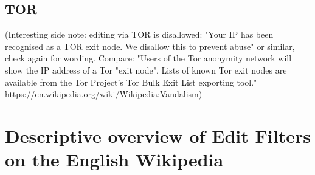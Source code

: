 \documentclass{sigchi}
\begin{document}
\subsection{TOR}
(Interesting side note: editing via TOR is disallowed: "Your IP has been recognised as a TOR exit node. We disallow this to prevent abuse" or similar, check again for wording. Compare: "Users of the Tor anonymity network will show the IP address of a Tor "exit node". Lists of known Tor exit nodes are available from the Tor Project's Tor Bulk Exit List exporting tool." \url{https://en.wikipedia.org/wiki/Wikipedia:Vandalism})



\section{Descriptive overview of Edit Filters on the English Wikipedia}
\end{document}
